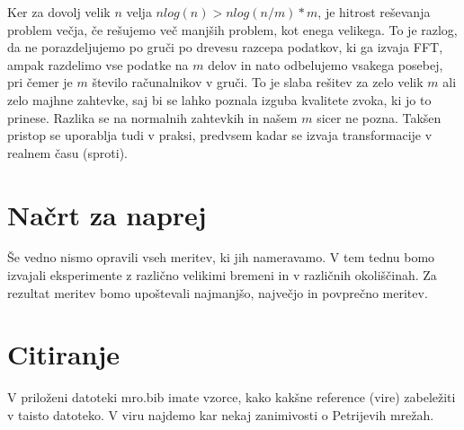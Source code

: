 Ker za dovolj velik $n$ velja $nlog(n) > nlog(n/m)*m$, je hitrost reševanja problem večja, če rešujemo več manjših problem, kot enega velikega. To je razlog, da ne porazdeljujemo po gruči po drevesu razcepa podatkov, ki ga izvaja FFT, ampak razdelimo vse podatke na $m$ delov in nato odbelujemo vsakega posebej, pri čemer je $m$ število računalnikov v gruči. To je slaba rešitev za zelo velik $m$ ali zelo majhne zahtevke, saj bi se lahko poznala izguba kvalitete zvoka, ki jo to prinese. Razlika se na normalnih zahtevkih in našem $m$ sicer ne pozna. Takšen pristop se uporablja tudi v praksi, predvsem kadar se izvaja transformacije v realnem času (sproti).

\section{Načrt za naprej}

Še vedno nismo opravili vseh meritev, ki jih nameravamo. V tem tednu bomo izvajali eksperimente z različno velikimi bremeni in v različnih okoliščinah. Za rezultat meritev bomo upoštevali najmanjšo, največjo in povprečno meritev.



\section{Citiranje}
V priloženi datoteki mro.bib imate vzorce, kako kakšne reference (vire) zabeležiti v taisto datoteko. V viru \cite{sch1} najdemo kar nekaj zanimivosti o Petrijevih mrežah.

